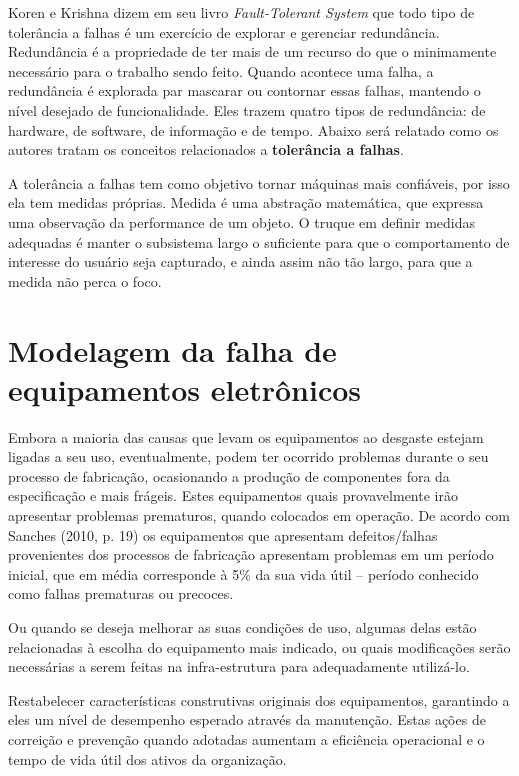 Koren e Krishna \cite{koren2007} dizem em seu livro \emph{Fault-Tolerant System} que todo tipo de tolerância a falhas é um exercício de explorar e gerenciar redundância. Redundância é a propriedade de ter mais de um recurso do que o minimamente necessário para o trabalho sendo feito. Quando acontece uma falha, a redundância é explorada par mascarar ou contornar essas falhas, mantendo o nível desejado de funcionalidade. Eles trazem quatro tipos de redundância: de hardware, de software, de informação e de tempo. Abaixo será relatado como os autores tratam os conceitos relacionados a \textbf{tolerância a falhas}. 

A tolerância a falhas tem como objetivo tornar máquinas mais confiáveis, por isso ela tem medidas próprias. Medida é uma abstração matemática, que expressa uma observação da performance de um objeto. O truque em definir medidas adequadas é manter o subsistema largo o suficiente para que o comportamento de interesse do usuário seja capturado, e ainda assim não tão largo, para que a medida não perca o foco. 

\section{Modelagem da falha de equipamentos eletrônicos}

Embora a maioria das causas que levam os equipamentos ao desgaste estejam ligadas a seu uso, eventualmente, podem ter ocorrido problemas durante o seu processo de fabricação, ocasionando a produção de componentes fora da especificação e mais frágeis. Estes equipamentos quais provavelmente irão apresentar problemas prematuros, quando colocados em operação. De acordo com Sanches (2010, p. 19) os equipamentos que apresentam defeitos/falhas provenientes dos processos de fabricação apresentam problemas em um período inicial, que em média corresponde à 5\% da sua vida útil – período conhecido como falhas prematuras ou precoces.

Ou quando se deseja melhorar as suas condições de uso, algumas delas estão relacionadas à escolha do equipamento mais indicado, ou quais modificações serão necessárias a serem feitas na infra-estrutura para adequadamente utilizá-lo.

Restabelecer características construtivas originais dos equipamentos, garantindo a eles um nível de desempenho esperado através da manutenção. 
Estas ações de correição e prevenção quando adotadas aumentam a eficiência operacional e o tempo de vida útil dos ativos da organização. 

